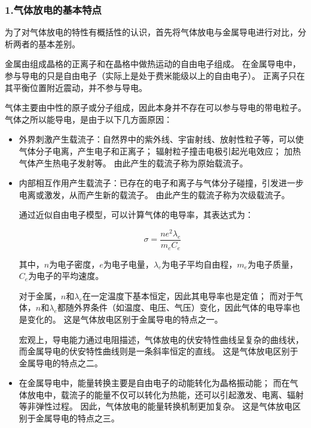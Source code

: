 \documentclass[12pt,a4paper,UTF8]{ctexart}
\begin{document}
\subsubsection*{1.气体放电的基本特点}


为了对气体放电的特性有概括性的认识，首先将气体放电与金属导电进行对比，分析两者的基本差别。

金属由组成晶格的正离子和在晶格中做热运动的自由电子组成。
在金属导电中，参与导电的只是自由电子（实际上是处于费米能级以上的自由电子）。
正离子只在其平衡位置附近震动，并不参与导电。

气体主要由中性的原子或分子组成，因此本身并不存在可以参与导电的带电粒子。
气体之所以能导电，是由于以下几方面原因：

\begin{itemize}
    \item 外界刺激产生载流子：自然界中的紫外线、宇宙射线、放射性粒子等，可以使气体分子电离，产生电子和正离子；
    辐射粒子撞击电极引起光电效应；
    加热气体产生热电子发射等。
    由此产生的载流子称为原始载流子。
    \item 内部相互作用产生载流子：已存在的电子和离子与气体分子碰撞，引发进一步电离或激发，从而产生新的载流子。
    由此产生的载流子称为次级载流子。


    通过近似自由电子模型，可以计算气体的电导率，其表达式为：

    \begin{equation}
        \sigma = \frac{n e^2 \lambda_e}{m_e C_e}
    \end{equation}

    其中，$n$为电子密度，$e$为电子电量，$\lambda_e$为电子平均自由程，$m_e$为电子质量，$C_e$为电子的平均速度。

    对于金属，$n$和$\lambda_e$在一定温度下基本恒定，因此其电导率也是定值；
    而对于气体，$n$和$\lambda_e$都随外界条件（如温度、电压、气压）变化，因此气体的电导率也是变化的。
    这是气体放电区别于金属导电的特点之一。

    宏观上，导电能力通过电阻描述，气体放电的伏安特性曲线呈复杂的曲线状，而金属导电的伏安特性曲线则是一条斜率恒定的直线。
    这是气体放电区别于金属导电的特点之二。

    \item 在金属导电中，能量转换主要是自由电子的动能转化为晶格振动能；
    而在气体放电中，载流子的能量不仅可以转化为热能，还可以引起激发、电离、辐射等非弹性过程。
    因此，气体放电的能量转换机制更加复杂。
    这是气体放电区别于金属导电的特点之三。

\end{itemize}
\end{document}
